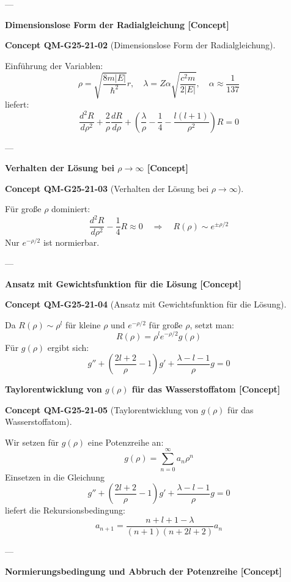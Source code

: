 \documentclass[10pt, letterpaper]{article}
\newcommand{\CustomHeading}[3]{%
  \par\medskip\noindent%
  \textbf{#1 #2} \textnormal{(#3)}.\enskip%
}
\newenvironment{CONC}[2]{\begin{unitbox}\CustomHeading{Concept}{#1}{#2}}{\end{unitbox}}
\begin{document}
---

\textbf{Dimensionslose Form der Radialgleichung [Concept]}

\begin{CONC}{QM-G25-21-02}{Dimensionslose Form der Radialgleichung}
Einführung der Variablen:
\[
\rho = \sqrt{\frac{8 m |E|}{\hbar^2}} r, \quad \lambda = Z \alpha \sqrt{\frac{c^2 m}{2|E|}}, \quad \alpha \approx \frac{1}{137}
\]
liefert:
\[
\frac{d^2 R}{d \rho^2} + \frac{2}{\rho} \frac{d R}{d \rho} + \left( \frac{\lambda}{\rho} - \frac{1}{4} - \frac{l(l+1)}{\rho^2} \right) R = 0
\]
\end{CONC}

---

\textbf{Verhalten der Lösung bei $\rho \to \infty$ [Concept]}

\begin{CONC}{QM-G25-21-03}{Verhalten der Lösung bei $\rho \to \infty$}
Für große $\rho$ dominiert:
\[
\frac{d^2 R}{d \rho^2} - \frac{1}{4} R \approx 0 \quad \Rightarrow \quad R(\rho) \sim e^{\pm \rho/2}
\]
Nur $e^{-\rho/2}$ ist normierbar.
\end{CONC}

---

\textbf{Ansatz mit Gewichtsfunktion für die Lösung [Concept]}

\begin{CONC}{QM-G25-21-04}{Ansatz mit Gewichtsfunktion für die Lösung}
Da $R(\rho) \sim \rho^l$ für kleine $\rho$ und $e^{-\rho/2}$ für große $\rho$, setzt man:
\[
R(\rho) = \rho^l e^{-\rho/2} g(\rho)
\]
Für $g(\rho)$ ergibt sich:
\[
g'' + \left( \frac{2l+2}{\rho} - 1 \right) g' + \frac{\lambda - l - 1}{\rho} g = 0
\]
\end{CONC}



\textbf{Taylorentwicklung von $g(\rho)$ für das Wasserstoffatom [Concept]}

\begin{CONC}{QM-G25-21-05}{Taylorentwicklung von $g(\rho)$ für das Wasserstoffatom}
Wir setzen für $g(\rho)$ eine Potenzreihe an:
\[
g(\rho) = \sum_{n=0}^\infty a_n \rho^n
\]
Einsetzen in die Gleichung
\[
g'' + \left( \frac{2l+2}{\rho} - 1 \right) g' + \frac{\lambda - l - 1}{\rho} g = 0
\]
liefert die Rekursionsbedingung:
\[
a_{n+1} = \frac{n + l + 1 - \lambda}{(n+1)(n + 2l + 2)} a_n
\]
\end{CONC}

---

\textbf{Normierungsbedingung und Abbruch der Potenzreihe [Concept]}
\end{document}
